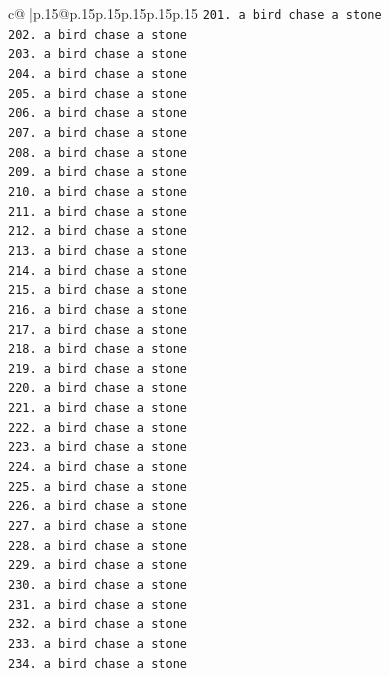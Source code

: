 \documentclass{article}
\begin{document}
{\begin{supertabular}{c@{$\;$}|p{.15\linewidth}@{}p{.15\linewidth}p{.15\linewidth}p{.15\linewidth}p{.15\linewidth}p{.15\linewidth}}
{{{\texttt{201. a bird chase a stone} \\
\texttt{202. a bird chase a stone} \\
\texttt{203. a bird chase a stone} \\
\texttt{204. a bird chase a stone} \\
\texttt{205. a bird chase a stone} \\
\texttt{206. a bird chase a stone} \\
\texttt{207. a bird chase a stone} \\
\texttt{208. a bird chase a stone} \\
\texttt{209. a bird chase a stone} \\
\texttt{210. a bird chase a stone} \\
\texttt{211. a bird chase a stone} \\
\texttt{212. a bird chase a stone} \\
\texttt{213. a bird chase a stone} \\
\texttt{214. a bird chase a stone} \\
\texttt{215. a bird chase a stone} \\
\texttt{216. a bird chase a stone} \\
\texttt{217. a bird chase a stone} \\
\texttt{218. a bird chase a stone} \\
\texttt{219. a bird chase a stone} \\
\texttt{220. a bird chase a stone} \\
\texttt{221. a bird chase a stone} \\
\texttt{222. a bird chase a stone} \\
\texttt{223. a bird chase a stone} \\
\texttt{224. a bird chase a stone} \\
\texttt{225. a bird chase a stone} \\
\texttt{226. a bird chase a stone} \\
\texttt{227. a bird chase a stone} \\
\texttt{228. a bird chase a stone} \\
\texttt{229. a bird chase a stone} \\
\texttt{230. a bird chase a stone} \\
\texttt{231. a bird chase a stone} \\
\texttt{232. a bird chase a stone} \\
\texttt{233. a bird chase a stone} \\
\texttt{234. a bird chase a stone} \\
}}}
\end{supertabular}}
\end{document}
